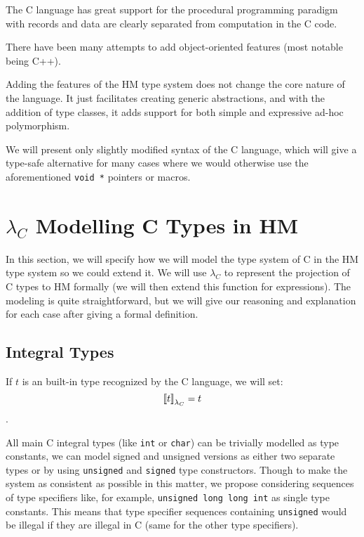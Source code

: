The C language has great support for the procedural programming paradigm with records and data are clearly separated from computation in the C code.

There have been many attempts to add object-oriented features (most notable being C++).

Adding the features of the HM type system does not change the core nature of the language. It just facilitates creating generic abstractions, and with the addition of type classes, it adds support for both simple and expressive ad-hoc polymorphism.

We will present only slightly modified syntax of the C language, which will give a type-safe alternative for many cases where we would otherwise use the aforementioned \lstinline{void *} pointers or macros.

\section{$\lambda_C$ Modelling C Types in HM}

In this section, we will specify how we will model the type system of C in the HM type system so we could extend it. We will use $\lambda_C$ to represent the projection of C types to HM formally (we will then extend this function for expressions). The modeling is quite straightforward, but we will give our reasoning and explanation for each case after giving a formal definition.

\subsection{Integral Types}

\begin{defn}
    If $t$ is an built-in type recognized by the C language, we will set: $${\llbracket t \rrbracket}_{\lambda_C} = t$$.
\end{defn}

All main C integral types (like \lstinline{int} or \lstinline{char}) can be trivially modelled as type constants, we can model signed and unsigned versions as either two separate types or by using \lstinline{unsigned} and \lstinline{signed} type constructors. Though to make the system as consistent as possible in this matter, we propose considering sequences of type specifiers like, for example, \lstinline{unsigned long long int} as single type constants. This means that type specifier sequences containing \lstinline{unsigned} would be illegal if they are illegal in C (same for the other type specifiers).

